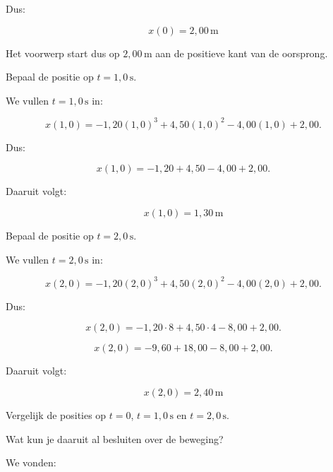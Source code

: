 \documentclass{ximera}
\begin{document}
\begin{oefening}{\oefU\ESS}
\begin{question}
\begin{oplossing}
  Dus:
  
  \[
  \boxed{x(0)=2{,}00\,\mathrm{m}}
  \]
  
  Het voorwerp start dus op $2{,}00\,\mathrm{m}$ aan de positieve kant van de
  oorsprong.
  \end{oplossing}
  \end{question}
  
  
  \begin{question}
  Bepaal de positie op $t=1{,}0\,\mathrm{s}$.
  
  \begin{oplossing}
  We vullen $t=1{,}0\,\mathrm{s}$ in:
  
  \[
  x(1{,}0)
  =
  -1{,}20(1{,}0)^3
  +4{,}50(1{,}0)^2
  -4{,}00(1{,}0)
  +2{,}00.
  \]
  
  Dus:
  
  \[
  x(1{,}0)
  =
  -1{,}20
  +4{,}50
  -4{,}00
  +2{,}00.
  \]
  
  Daaruit volgt:
  
  \[
  \boxed{x(1{,}0)=1{,}30\,\mathrm{m}}
  \]
  \end{oplossing}
  \end{question}
  
  
  \begin{question}
  Bepaal de positie op $t=2{,}0\,\mathrm{s}$.
  
  \begin{oplossing}
  We vullen $t=2{,}0\,\mathrm{s}$ in:
  
  \[
  x(2{,}0)
  =
  -1{,}20(2{,}0)^3
  +4{,}50(2{,}0)^2
  -4{,}00(2{,}0)
  +2{,}00.
  \]
  
  Dus:
  
  \[
  x(2{,}0)
  =
  -1{,}20\cdot8
  +4{,}50\cdot4
  -8{,}00
  +2{,}00.
  \]
  
  \[
  x(2{,}0)
  =
  -9{,}60+18{,}00-8{,}00+2{,}00.
  \]
  
  Daaruit volgt:
  
  \[
  \boxed{x(2{,}0)=2{,}40\,\mathrm{m}}
  \]
  \end{oplossing}
  \end{question}
  
  
  \begin{question}
  Vergelijk de posities op $t=0$, $t=1{,}0\,\mathrm{s}$ en
  $t=2{,}0\,\mathrm{s}$.
  
  Wat kun je daaruit al besluiten over de beweging?
  
  \begin{oplossing}
  We vonden:
  

\end{oplossing}
\end{question}
\end{oefening}
\end{document}
